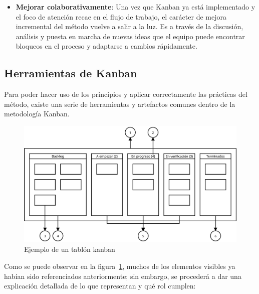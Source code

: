 \begin{itemize}
    \item \textbf{Mejorar colaborativamente}: %
    Una vez que Kanban ya está implementado y el foco de atención recae en el
    flujo de trabajo, el carácter de mejora incremental del método vuelve a
    salir a la luz. Es a través de la discusión, análisis y puesta en marcha de
    nuevas ideas que el equipo puede encontrar bloqueos en el proceso y
    adaptarse a cambios rápidamente.
\end{itemize}

\subsection{Herramientas de Kanban}

Para poder hacer uso de los principios y aplicar correctamente las prácticas del
método, existe una serie de herramientas y artefactos comunes dentro de la
metodología Kanban.

\begin{figure}[H]
    \centering
    \includegraphics[width=0.85\linewidth]{5-Cuerpo/Chapter2/TablonKanban.png}
    \caption{Ejemplo de un tablón kanban}\label{fig:kanbanboard}
\end{figure}

Como se puede observar en la figura~\ref{fig:kanbanboard}, muchos de los elementos visibles ya
habían sido referenciados anteriormente; sin embargo, se procederá a dar una
explicación detallada de lo que representan y qué rol cumplen:

